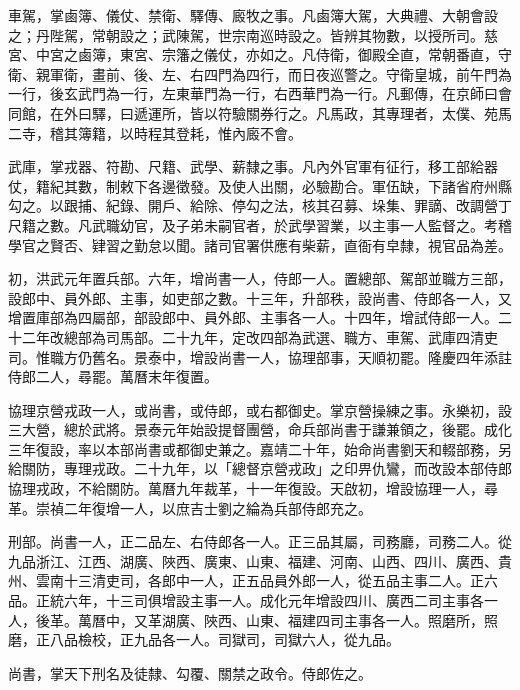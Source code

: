 車駕，掌鹵簿、儀仗、禁衛、驛傳、廄牧之事。凡鹵簿大駕，大典禮、大朝會設之；丹陛駕，常朝設之；武陳駕，世宗南巡時設之。皆辨其物數，以授所司。慈宮、中宮之鹵簿，東宮、宗籓之儀仗，亦如之。凡侍衛，御殿全直，常朝番直，守衛、親軍衛，畫前、後、左、右四門為四行，而日夜巡警之。守衛皇城，前午門為一行，後玄武門為一行，左東華門為一行，右西華門為一行。凡郵傳，在京師曰會同館，在外曰驛，曰遞運所，皆以符驗關券行之。凡馬政，其專理者，太僕、苑馬二寺，稽其簿籍，以時程其登耗，惟內廄不會。

武庫，掌戎器、符勘、尺籍、武學、薪隸之事。凡內外官軍有征行，移工部給器仗，籍紀其數，制敕下各邊徵發。及使人出關，必驗勘合。軍伍缺，下諸省府州縣勾之。以跟捕、紀錄、開戶、給除、停勾之法，核其召募、垛集、罪謫、改調營丁尺籍之數。凡武職幼官，及子弟未嗣官者，於武學習業，以主事一人監督之。考稽學官之賢否、肄習之勤怠以聞。諸司官署供應有柴薪，直衙有皁隸，視官品為差。

初，洪武元年置兵部。六年，增尚書一人，侍郎一人。置總部、駕部並職方三部，設郎中、員外郎、主事，如吏部之數。十三年，升部秩，設尚書、侍郎各一人，又增置庫部為四屬部，部設郎中、員外郎、主事各一人。十四年，增試侍郎一人。二十二年改總部為司馬部。二十九年，定改四部為武選、職方、車駕、武庫四清吏司。惟職方仍舊名。景泰中，增設尚書一人，協理部事，天順初罷。隆慶四年添註侍郎二人，尋罷。萬曆末年復置。

協理京營戎政一人，或尚書，或侍郎，或右都御史。掌京營操練之事。永樂初，設三大營，總於武將。景泰元年始設提督團營，命兵部尚書于謙兼領之，後罷。成化三年復設，率以本部尚書或都御史兼之。嘉靖二十年，始命尚書劉天和輟部務，另給關防，專理戎政。二十九年，以「總督京營戎政」之印畀仇鸞，而改設本部侍郎協理戎政，不給關防。萬曆九年裁革，十一年復設。天啟初，增設協理一人，尋革。崇禎二年復增一人，以庶吉士劉之綸為兵部侍郎充之。

刑部。尚書一人，正二品左、右侍郎各一人。正三品其屬，司務廳，司務二人。從九品浙江、江西、湖廣、陜西、廣東、山東、福建、河南、山西、四川、廣西、貴州、雲南十三清吏司，各郎中一人，正五品員外郎一人，從五品主事二人。正六品。正統六年，十三司俱增設主事一人。成化元年增設四川、廣西二司主事各一人，後革。萬曆中，又革湖廣、陜西、山東、福建四司主事各一人。照磨所，照磨，正八品檢校，正九品各一人。司獄司，司獄六人，從九品。

尚書，掌天下刑名及徒隸、勾覆、關禁之政令。侍郎佐之。

